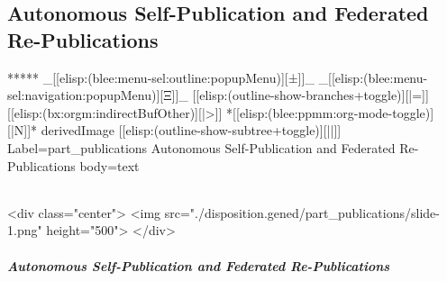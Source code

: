 \begin{whenOrg}
\newpage
\part{Autonomous Self-Publication and Federated Re-Publications}

\begin{whenOrg}
*****  _[[elisp:(blee:menu-sel:outline:popupMenu)][±]]_ _[[elisp:(blee:menu-sel:navigation:popupMenu)][Ξ]]_ [[elisp:(outline-show-branches+toggle)][|=]] [[elisp:(bx:orgm:indirectBufOther)][|>]] *[[elisp:(blee:ppmm:org-mode-toggle)][|N]]*  derivedImage [[elisp:(outline-show-subtree+toggle)][||]] Label=part_publications Autonomous Self-Publication and Federated Re-Publications body=text
\end{whenOrg}

\begin{htmlonly}

\begin{frame}[fragile,plain,label=part_publications]
    \frametitle{}
    \framesubtitle{}
    \begin{rawhtml}
<div class="center">
<img src="./disposition.gened/part_publications/slide-1.png" height="500">
</div>
    \end{rawhtml}
\end{frame}
\end{htmlonly}

\begin{verblatex}

\begin{frame}[fragile,label=part_publications]
    \frametitle{Autonomous Self-Publication and Federated Re-Publications}
    \framesubtitle{}

    \tableofcontents


\end{frame}
\end{verblatex}



\end{whenOrg}

